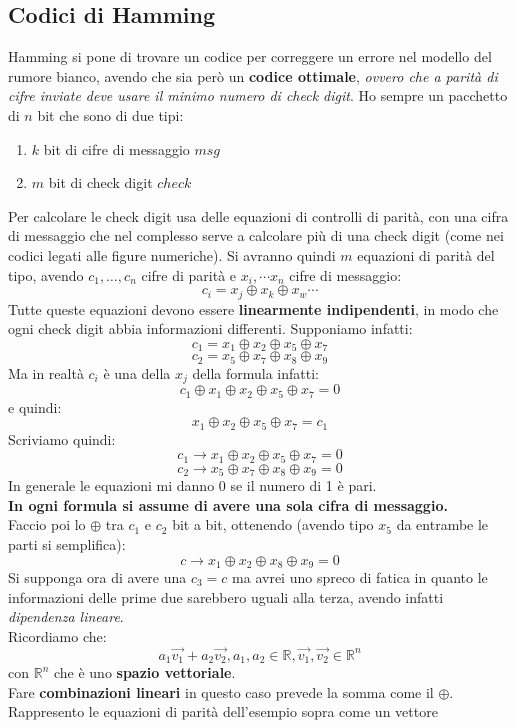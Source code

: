 \documentclass[a4paper,12pt, oneside]{book}
\begin{document}
\subsection{Codici di Hamming}
Hamming si pone di trovare un codice per correggere un errore nel modello del
rumore bianco, avendo che sia però un \textbf{codice ottimale}, \textit{ovvero
  che a parità di cifre inviate deve usare il minimo numero di check digit}.
Ho sempre un pacchetto di $n$ bit che sono di due tipi:
\begin{enumerate}
  \item $k$ bit di cifre di messaggio $msg$
  \item $m$ bit di check digit $check$
\end{enumerate}
Per calcolare le check digit usa delle equazioni di controlli di parità, con una
cifra di messaggio che nel complesso serve a calcolare più di una check digit
(come nei codici legati alle figure numeriche). Si avranno quindi $m$ equazioni
di parità del tipo, avendo $c_1,\ldots,c_n$ cifre di parità e $x_i,\cdots x_n$
cifre di messaggio:
\[c_i=x_j\oplus x_k\oplus x_w \cdots\]
Tutte queste equazioni devono essere \textbf{linearmente indipendenti}, in modo
che ogni check digit abbia informazioni differenti. Supponiamo infatti:
\[c_1=x_1\oplus x_2\oplus x_5 \oplus x_7\]
\[c_2=x_5\oplus x_7\oplus x_8 \oplus x_9\]
Ma in realtà $c_i$ è una della $x_j$ della formula infatti:
\[c_1\oplus x_1\oplus x_2\oplus x_5 \oplus x_7=0\]
e quindi:
\[x_1\oplus x_2\oplus x_5 \oplus x_7=c_1\]
Scriviamo quindi:
\[c_1\to x_1\oplus x_2\oplus x_5 \oplus x_7=0\]
\[c_2\to x_5\oplus x_7\oplus x_8 \oplus x_9=0\]
In generale le equazioni mi danno 0 se il numero di 1 è pari.\\
\textbf{In ogni formula si assume di avere una sola cifra di messaggio.}\\
Faccio poi lo $\oplus$ tra $c_1$ e $c_2$ bit a bit, ottenendo (avendo tipo $x_5$
da entrambe le parti si semplifica):
\[c\to x_1\oplus x_2\oplus x_8\oplus x_9=0\]
Si supponga ora di avere una $c_3=c$ ma avrei uno spreco di fatica in quanto le
informazioni delle prime due sarebbero uguali alla terza, avendo infatti
\textit{dipendenza lineare}.\\
Ricordiamo che:
\[a_1\vec{v_1}+a_2\vec{v_2},a_1,a_2\in \mathbb{R}, \vec{v_1},\vec{v_2}\in
  \mathbb{R}^n\]
con $\mathbb{R}^n$ che è uno \textbf{spazio vettoriale}.\\
Fare \textbf{combinazioni lineari} in questo caso prevede la somma come il
$\oplus$. Rappresento le equazioni di parità dell'esempio sopra come un vettore
\end{document}
